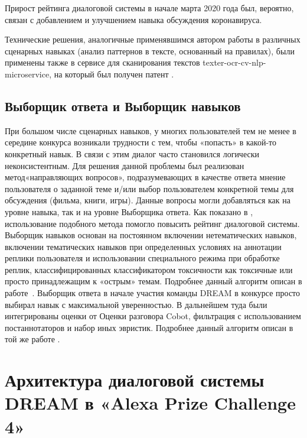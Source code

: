 Прирост рейтинга диалоговой системы в начале марта 2020 года был, вероятно, связан с добавлением и улучшением навыка обсуждения коронавируса.

Технические решения, аналогичные применявшимся автором работы в различных сценарных навыках (анализ паттернов в тексте, основанный на правилах), были применены также в сервисе для сканирования текстов texter-ocr-cv-nlp-microservice, на который был получен патент \cite{Дуплякин_Дмитрий_Ондар_Ушаков_2021}.

\subsection{Выборщик ответа и Выборщик навыков}

При большом числе сценарных навыков, у многих пользователей тем не менее в середине конкурса возникали трудности с тем, чтобы «попасть» в какой-то конкретный навык. В связи с этим диалог часто становился логически неконсистентным. Для решения данной проблемы был реализован метод«направляющих вопросов», подразумевающих в качестве ответа мнение пользователя о заданной теме и/или выбор пользователем конкретной темы для обсуждения (фильма, книги, игры). Данные вопросы могли добавляться как на уровне навыка, так и на уровне Выборщика ответа. Как показано в \cite{dream1}, использование подобного метода помогло повысить рейтинг диалоговой системы.
Выборщик навыков основан на постоянном включении нетематических навыков, включении тематических навыков при определенных условиях на аннотации реплики пользователя и использовании специального режима при обработке реплик, классифицированных классификатором токсичности как токсичные или просто принадлежащим к «острым» темам. Подробнее данный алгоритм описан в работе~\cite{dilya_thesis}.
Выборщик ответа в начале участия команды {DREAM} в конкурсе просто выбирал навык с максимальной уверенностью. В дальнейшем туда были интегрированы оценки от Оценки разговора Cobot, фильтрация с использованием постаннотаторов и набор иных эвристик. Подробнее данный алгоритм описан в той же работе \cite{dilya_thesis}.

\section{Архитектура диалоговой системы {DREAM} в  «Alexa Prize Challenge 4»}


